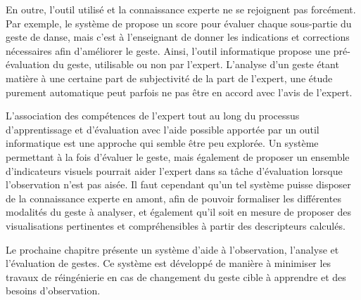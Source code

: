 En outre, l'outil utilisé et la connaissance experte ne se rejoignent pas forcément. Par exemple, le système de \parencite{Kyan2015ABD} propose un score pour évaluer chaque sous-partie du geste de danse, mais c'est à l'enseignant de donner les indications et corrections nécessaires afin d'améliorer le geste. Ainsi, l'outil informatique propose une pré-évaluation du geste, utilisable ou non par l'expert. L'analyse d'un geste étant matière à une certaine part de subjectivité de la part de l'expert, une étude purement automatique peut parfois ne pas être en accord avec l'avis de l'expert.

L'association des compétences de l'expert tout au long du processus d'apprentissage et d'évaluation avec l'aide possible apportée par un outil informatique est une approche qui semble être peu explorée. Un système permettant à la fois d'évaluer le geste, mais également de proposer un ensemble d'indicateurs visuels pourrait aider l'expert dans sa tâche d'évaluation lorsque l'observation n'est pas aisée. Il faut cependant qu'un tel système puisse disposer de la connaissance experte en amont, afin de pouvoir formaliser les différentes modalités du geste à analyser, et également qu'il soit en mesure de proposer des visualisations pertinentes et compréhensibles à partir des descripteurs calculés.

Le prochaine chapitre présente un système d'aide à l'observation, l'analyse et l'évaluation de gestes. Ce système est développé de manière à minimiser les travaux de réingénierie en cas de changement du geste cible à apprendre et des besoins d'observation.